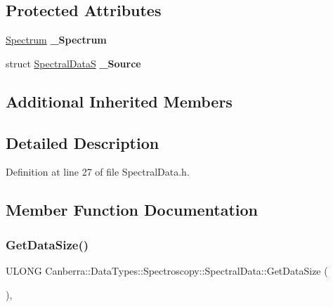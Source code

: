 \subsection*{Protected Attributes}
\begin{DoxyCompactItemize}
\item 
\mbox{\label{class_canberra_1_1_data_types_1_1_spectroscopy_1_1_spectral_data_adcd9ba2fda2dccf152aed5012e856425}} 
\hyperlink{class_canberra_1_1_data_types_1_1_spectroscopy_1_1_spectrum}{Spectrum} {\bfseries \+\_\+\+Spectrum}
\item 
\mbox{\label{class_canberra_1_1_data_types_1_1_spectroscopy_1_1_spectral_data_aa52371e1feb7421949ec27c02af73357}} 
struct \hyperlink{struct_spectral_data_s}{Spectral\+DataS} {\bfseries \+\_\+\+Source}
\end{DoxyCompactItemize}
\subsection*{Additional Inherited Members}


\subsection{Detailed Description}


Definition at line 27 of file Spectral\+Data.\+h.



\subsection{Member Function Documentation}
\mbox{\label{class_canberra_1_1_data_types_1_1_spectroscopy_1_1_spectral_data_ac95bb6b9dd1b89c6c85b9a8afccd5d20_ac95bb6b9dd1b89c6c85b9a8afccd5d20}} 
\subsubsection{\texorpdfstring{Get\+Data\+Size()}{GetDataSize()}}
{\footnotesize\ttfamily U\+L\+O\+NG Canberra\+::\+Data\+Types\+::\+Spectroscopy\+::\+Spectral\+Data\+::\+Get\+Data\+Size (\begin{DoxyParamCaption}{ }\end{DoxyParamCaption})\hspace{0.3cm}{\ttfamily [protected]}, {\ttfamily [virtual]}}

